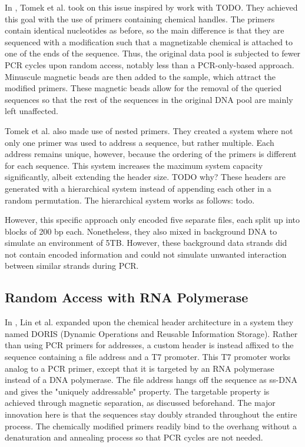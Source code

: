 \documentclass[a4paper,conference]{IEEEtran}
\begin{document}
In \cite{chemicalhandles}, Tomek et al. took on this issue inspired by \cite{chemicalhandles} work with TODO. They achieved this goal with the use of primers containing chemical handles. The primers contain identical nucleotides as before, so the main difference is that they are sequenced with a modification such that a magnetizable chemical is attached to one of the ends of the sequence. Thus, the original data pool is subjected to fewer PCR cycles upon random access, notably less than a PCR-only-based approach. Minuscule magnetic beads are then added to the sample, which attract the modified primers. These magnetic beads allow for the removal of the queried sequences so that the rest of the sequences in the original DNA pool are mainly left unaffected.

Tomek et al. also made use of nested primers. They created a system where not only one primer was used to address a sequence, but rather multiple. Each address remains unique, however, because the ordering of the primers is different for each sequence. This system increases the maximum system capacity significantly, albeit extending the header size. TODO why? These headers are generated with a hierarchical system instead of appending each other in a random permutation. The hierarchical system works as follows:  todo.

However, this specific approach only encoded five separate files, each split up into blocks of 200 bp each. Nonetheless, they also mixed in background DNA to simulate an environment of 5TB. However, these background data strands did not contain encoded information and could not simulate unwanted interaction between similar strands during PCR.

\subsection{Random Access with RNA Polymerase}
In \cite{DORIS}, Lin et al. expanded upon the chemical header architecture in a system they named DORIS (Dynamic Operations and Reusable Information Storage). Rather than using PCR primers for addresses, a custom header is instead affixed to the sequence containing a file address and a T7 promoter. This T7 promoter works analog to a PCR primer, except that it is targeted by an RNA polymerase instead of a DNA polymerase. The file address hangs off the sequence as ss-DNA and gives the "uniquely addressable" property. The targetable property is achieved through magnetic separation, as discussed beforehand. The major innovation here is that the sequences stay doubly stranded throughout the entire process. The chemically modified primers readily bind to the overhang without a denaturation and annealing process so that PCR cycles are not needed. 
\end{document}
